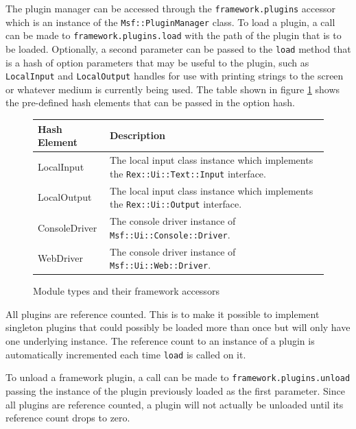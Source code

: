 \documentclass{report}
\begin{document}
\par
The plugin manager can be accessed through the
\texttt{framework.plugins} accessor which is an instance of the
\texttt{Msf::PluginManager} class. To load a plugin, a call can be
made to \texttt{framework.plugins.load} with the path of the plugin
that is to be loaded.  Optionally, a second parameter can be passed
to the \texttt{load} method that is a hash of option parameters that
may be useful to the plugin, such as \texttt{LocalInput} and
\texttt{LocalOutput} handles for use with printing strings to the
screen or whatever medium is currently being used.  The table shown
in figure \ref{fig-table-plugin-hash} shows the pre-defined hash
elements that can be passed in the option hash.

\begin{figure}[h]
\begin{center}
\begin{tabular}{|l|p{3.5in}|}
\hline
\textbf{Hash Element} & \textbf{Description} \\
\hline
LocalInput & The local input class instance which implements the \texttt{Rex::Ui::Text::Input} interface. \\
LocalOutput & The local input class instance which implements the \texttt{Rex::Ui::Output} interface. \\
ConsoleDriver & The console driver instance of \texttt{Msf::Ui::Console::Driver}. \\
WebDriver & The console driver instance of \texttt{Msf::Ui::Web::Driver}. \\
\hline
\end{tabular}
\caption{Module types and their framework accessors}
\label{fig-table-plugin-hash}
\end{center}
\end{figure}

\par
All plugins are reference counted.  This is to make it possible to
implement singleton plugins that could possibly be loaded more than
once but will only have one underlying instance.  The reference
count to an instance of a plugin is automatically incremented each
time \texttt{load} is called on it.

\par
To unload a framework plugin, a call can be made to
\texttt{framework.plugins.unload} passing the instance of the plugin
previously loaded as the first parameter.  Since all plugins are
reference counted, a plugin will not actually be unloaded until its
reference count drops to zero.
\end{document}

